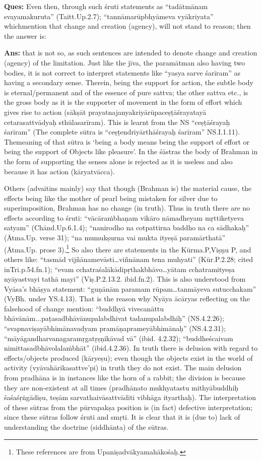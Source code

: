 \textbf{Ques:} Even then, through such śruti statements as “tadātmānam svayamakuruta” (Taitt.Up.2.7); “tannāmarūpbhyāmeva vyākriyata” which\break mention that change and creation (agency), will not stand to reason; then the answer is:

\textbf{Ans:} that is not so, as such sentences are intended to denote change and creation (agency) of the limitation. Just like the jīva, the paramātman also having two bodies, it is not correct to interpret statements like “yasya sarve śarīram” as having a secondary sense. Therein, being the support for action, the subtle body is eternal/permanent and of the essence of pure sattva; the other sattva etc., is the gross body as it is the supporter of movement in the form of effort which gives rise to action (sākṣāt prayatnajanyakriyārūpaceṣṭāśrayatayā cetarasattvādyaḥ sthūlasarīram). This is learnt from the NS “ceṣṭāśrayaḥ śarīram” (The complete sūtra is “ceṣṭendriyārthāśrayaḥ śarīram” NS.I.1.11). The\break meaning of that sūtra is ‘being a body means being the support of effort or being the support of Objects like pleasure’. In the śāstras the body of Brahman in the form of supporting the senses alone is rejected as it is useless and also because it has action (kāryatvācca).

Others (advaitins mainly) say that though (Brahman is) the material cause, the effects being like the mother of pearl being mistaken for silver due to superimposition, Brahman has no change (in truth). Thus in truth there are no effects according to śruti: “vācāraṁbhaṇam vikāro nāmadheyam mṛttiketyeva satyam” (Chānd.Up.6.1.4); “nanirodho na cotpattirna baddho na ca sādhakaḥ” (Ātma.Up. verse 31); “na mumukṣurna vai mukta ityeṣā paramārthatā” (Ātma.Up. prose 3).\footnote{These references are from Upaniṣadvākyamahākośaḥ.} So also there are statements in the  Kūrma.P,Viṣṇu P, and others like: “tasmād vijñānamevāsti…viñnānam tena muhyati” (Kūr.P.2.28; cited in\break Tri.p.54.fn.1);  “evam cchatraśalākādipṛthakbhāvo…yātam cchatramityeṣa nyāyastvayi tathā mayi” (Viṣ.P.2.13.2. ibid.fn.2). This is also understood from Vyāsa’s bhāṣya statement: “guṇānām paramam rūpam\-…tanmāyeva sutucchakam” (VyBh. under YS.4.13). That is the reason why Nyāya ācāryas reflecting on the falsehood of change mention: “buddhyā vivecanāttu bhāvānām...paṭasadbhāvānupalabdhivat tadanupalabdhiḥ” (NS.4.2.26); “svapnaviṣayābhimānavadyam pramā\-ṇaprameyābhimānaḥ” (NS.4.2.31); “māyāgandharvanagaramṛgatṛṣṇi\-kāvad vā” (ibid. 4.2.32); “buddheścaivam nimittasadbhāvolalaṁbhāt” (ibid.4.2.36).  In truth there is delusion with regard to effects/objects produced (kāryeṣu); even though the objects exist in the world of activity (vyāvahārikasattve’pi) in truth they do not exist. The main delusion from pradhāna is in instances like the horn of a rabbit; the division is because they are non-existent at all times (pradhānato mukhyatastu mithyābuddhiḥ śaśaśṛṅgādiṣu, teṣām sarvathaivāsattvāditi vibhāga ityarthaḥ). The interpretation of these sūtras from the pūrvapakṣa position is (in fact) defective interpretation;  since these sūtras follow śruti and smṛti. It is clear that it is (due to) lack of understanding the doctrine (siddhānta) of the sūtras.


